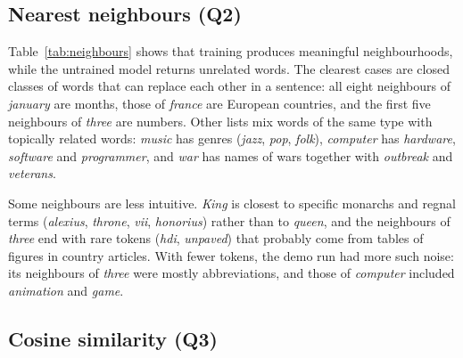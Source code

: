 \subsection{Nearest neighbours (Q2)}

\begin{table}[t]
    \centering
    \small
    
    \caption{Nearest neighbours by cosine similarity, final run and the same model before training. All 8 query words were fixed in advance.}
    \label{tab:neighbours}
\end{table}

Table~\ref{tab:neighbours} shows that training produces meaningful neighbourhoods, while the untrained model returns unrelated words. The clearest cases are closed classes of words that can replace each other in a sentence: all eight neighbours of \textit{january} are months, those of \textit{france} are European countries, and the first five neighbours of \textit{three} are numbers. Other lists mix words of the same type with topically related words: \textit{music} has genres (\textit{jazz}, \textit{pop}, \textit{folk}), \textit{computer} has \textit{hardware}, \textit{software} and \textit{programmer}, and \textit{war} has names of wars together with \textit{outbreak} and \textit{veterans}.

Some neighbours are less intuitive. \textit{King} is closest to specific monarchs and regnal terms (\textit{alexius}, \textit{throne}, \textit{vii}, \textit{honorius}) rather than to \textit{queen}, and the neighbours of \textit{three} end with rare tokens (\textit{hdi}, \textit{unpaved}) that probably come from tables of figures in country articles. With fewer tokens, the demo run had more such noise: its neighbours of \textit{three} were mostly abbreviations, and those of \textit{computer} included \textit{animation} and \textit{game}.

\subsection{Cosine similarity (Q3)}

\begin{table}[t]
    \centering
    \small
    
    \caption{Cosine similarity of fixed word pairs, with its percentile pN among random pairs of the \BaselineWords{} most frequent words of the same model. Above the line: related pairs; below: unrelated control pairs. ``Untrained'' is the final model before training.}
    \label{tab:cosine}
\end{table}

